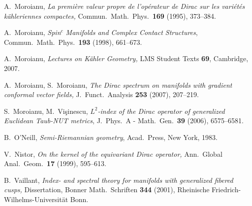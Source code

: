 \documentclass[12pt]{amsart}
\begin{document}
\begin{thebibliography}{9}
A.~Moroianu, 
{\sl La premi\`ere valeur propre de l'op\'erateur de Dirac sur les vari\'et\'es k\"ahleriennes compactes, }
Commun.\ Math.\ Phys.\ {\bf 169} (1995), 373--384. 

A.~Moroianu, 
{\sl Spin$^c$ Manifolds and Complex Contact Structures}, 
Commun.\ Math.\ Phys.\ {\bf 193} (1998), 661--673. 

A.~Moroianu, {\it Lectures on K\"ahler Geometry,} LMS Student Texts
{\bf 69}, Cambridge, 2007. 

A.~Moroianu, S.~Moroianu,
{\sl The Dirac spectrum on manifolds with gradient conformal vector 
fields, } J.\ Funct.\ Analysis {\bf 253} (2007), 207--219.

S.~Moroianu, M.~Vi\c sinescu,
{\sl $L^2$-index of the Dirac operator of generalized 
Euclidean Taub-NUT metrics}, 
J.\ Phys.\ A - Math.\ Gen.\ {\bf 39} (2006), 6575--6581.

B.~O'Neill, {\it Semi-Riemannian geometry}, Acad.\ Press, New York, 1983.

V.~Nistor,
{\sl On the kernel of the equivariant Dirac operator, }
Ann.\ Global Anal.\ Geom.\ {\bf 17} (1999), 595--613.

B.~Vaillant,
{\sl Index- and spectral theory for manifolds with generalized
  fibered cusps, }
Dissertation, Bonner Math.\ Schriften {\bf 344} (2001), 
Rheinische Friedrich-Wilhelms-Universit\"at Bonn.

\end{thebibliography}
\end{document}
